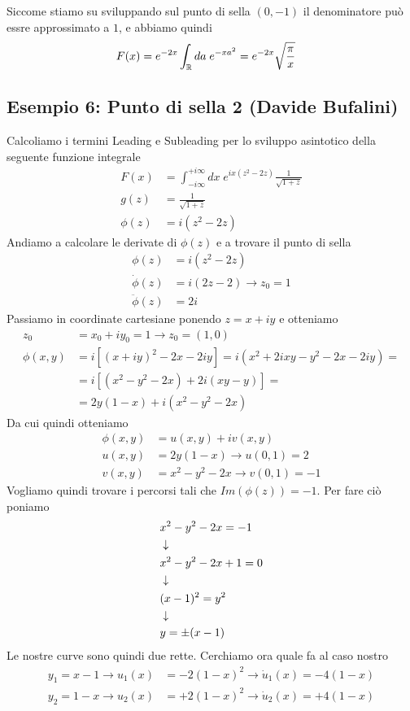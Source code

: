 Siccome stiamo su sviluppando sul punto di sella $(0,-1)$ il denominatore può essre approssimato a $1$, e abbiamo quindi
\begin{align}
	F(x) &= e^{-2x}\int_{\mathbb{R}} da \; e^{-xa^2} = e^{-2x} \sqrt{\frac{\pi}{x}}
\end{align}

\newpage

\subsection{Esempio 6: Punto di sella 2 (Davide Bufalini)}

Calcoliamo i termini Leading e Subleading per lo sviluppo asintotico della seguente funzione integrale
\begin{align}
	F(x) &= \int_{-i\infty}^{+i\infty} dx \; e^{ix(z^2-2z)} \frac{1}{\sqrt{1+z}}\\
	g(z) &=\frac{1}{\sqrt{1+z}}\\
	\phi(z) &= i(z^2-2z)
\end{align}
Andiamo a calcolare le derivate di $\phi(z)$ e a trovare il punto di sella
\begin{align}
	\phi(z) &= i(z^2-2z)\\
	\dot{\phi}(z) &= i(2z-2) \to z_0=1\\
	\ddot{\phi}(z) &= 2i
\end{align}
Passiamo in coordinate cartesiane ponendo $z = x+iy$ e otteniamo
\begin{align}
	z_0 &= x_0 + iy_0 = 1 \to z_0=(1,0)\\
	\phi(x,y) &= i[( x+iy )^2 -2x -2iy] = i( x^2 + 2ixy -y^2  -2x -2iy) = \nonumber\\
	&= i[( x^2 -y^2 -2x ) + 2i (xy -y)]  = \nonumber\\
	&=2y(1-x) + i( x^2 -y^2 -2x )
\end{align}
Da cui quindi otteniamo
\begin{align}
	\phi(x,y) &= u(x,y) + iv(x,y)\\
	u(x,y) &= 2y(1-x) \to u(0,1) = 2\\
	v(x,y) &= x^2 -y^2 -2x \to v(0,1) = -1
\end{align}
Vogliamo quindi trovare i percorsi tali che $Im(\phi(z)) = -1$. Per fare ciò poniamo
\begin{align}
	&x^2 -y^2 -2x = -1\\ &\downarrow \nonumber \\
	&x^2 -y^2 -2x +1 =0\nonumber \\ &\downarrow \nonumber \\
	&(x-1)^2 = y^2\nonumber \\ &\downarrow \nonumber \\
	&y=\pm(x-1)
\end{align}
Le nostre curve sono quindi due rette. Cerchiamo ora quale fa al caso nostro
\begin{align}
	y_1=x-1 \to u_1(x) &= -2(1-x)^2 \to \dot{u}_1(x) = -4(1-x)\\
	y_2=1-x \to u_2(x) &= +2(1-x)^2 \to \dot{u}_2(x) = +4(1-x)
\end{align}

